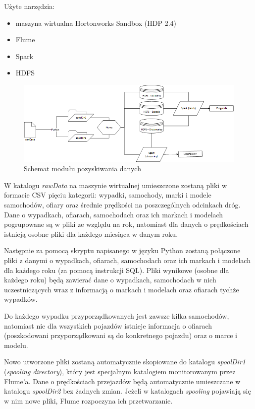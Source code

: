 \documentclass{article}
\begin{document}
Użyte narzędzia:
\begin{itemize}
    \item maszyna wirtualna Hortonworks Sandbox (HDP 2.4)
    \item Flume
    \item Spark
    \item HDFS
\end{itemize}

\begin{figure}[H]
\centering
\includegraphics[scale=0.6]{schemat}
\caption{Schemat modułu pozyskiwania danych}
\end{figure}

W katalogu \textit{rawData} na maszynie wirtualnej umieszczone zostaną pliki w formacie CSV pięciu kategorii: wypadki, samochody, marki i modele samochodów, ofiary oraz średnie prędkości na poszczególnych odcinkach dróg. Dane o wypadkach, ofiarach, samochodach oraz ich markach i modelach pogrupowane są w pliki ze względu na rok, natomiast dla danych o prędkościach istnieją osobne pliki dla każdego miesiąca w danym roku.

Następnie za pomocą skryptu napisanego w języku Python zostaną połączone pliki z danymi o wypadkach, ofiarach, samochodach oraz ich markach i modelach dla każdego roku (za pomocą instrukcji SQL). Pliki wynikowe (osobne dla każdego roku) będą zawierać dane o wypadkach, samochodach w nich uczestniczących wraz z informacją o markach i modelach oraz ofiarach tychże wypadków.

Do każdego wypadku przyporządkowanych jest zawsze kilka samochodów, natomiast nie dla wszystkich pojazdów istnieje informacja o ofiarach (poszkodowani przyporządkowani są do konkretnego pojazdu) oraz o marce i modelu.

Nowo utworzone pliki zostaną automatycznie skopiowane do katalogu \textit{spoolDir1} (\textit{spooling directory}), który jest specjalnym katalogiem monitorowanym przez Flume’a. Dane o prędkościach przejazdów będą automatycznie umieszczane w katalogu \textit{spoolDir2} bez żadnych zmian. Jeżeli w katalogach \textit{spooling} pojawiają się w nim nowe pliki, Flume rozpoczyna ich przetwarzanie.
\end{document}
